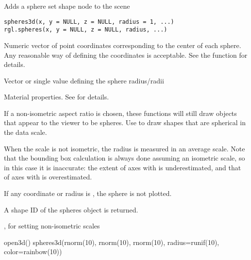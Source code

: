 \documentclass{article}
\begin{document}
\begin{Description}\relax
Adds a sphere set shape node to the scene
\end{Description}
\begin{Usage}
\begin{verbatim}
spheres3d(x, y = NULL, z = NULL, radius = 1, ...)
rgl.spheres(x, y = NULL, z = NULL, radius, ...)
\end{verbatim}
\end{Usage}
\begin{Arguments}
\begin{ldescription}
\item[\code{x, y, z}] Numeric vector of point coordinates corresponding to
the center of each sphere.  Any reasonable way of defining the
coordinates is acceptable.  See the function 
for details.
\item[\code{radius}] Vector or single value defining the sphere radius/radii
\item[\code{ ... }] Material properties. See  for details.
\end{ldescription}
\end{Arguments}
\begin{Details}\relax
If a non-isometric aspect ratio is chosen, these functions will still draw
objects that appear to the viewer to be spheres.  Use  
to draw shapes that are spherical in the data scale.

When the scale is not isometric, the radius is measured in an average scale.
Note that the bounding box calculation is always done assuming an 
isometric scale, so in this case it is inaccurate:  the extent of axes 
with  is underestimated, and that of axes with 
 is overestimated.

If any coordinate or radius is , the sphere is not plotted.
\end{Details}
\begin{Value}
A shape ID of the spheres object is returned.
\end{Value}
\begin{SeeAlso}\relax
{},  for setting non-isometric scales
\end{SeeAlso}
\begin{Examples}
\begin{ExampleCode}
open3d()
spheres3d(rnorm(10), rnorm(10), rnorm(10), radius=runif(10), color=rainbow(10))
\end{ExampleCode}
\end{Examples}
\end{document}
